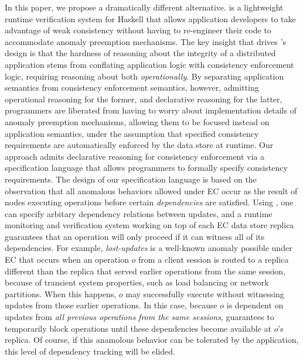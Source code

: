 In this paper, we propose a dramatically different alternative.  \tool
is a lightweight runtime verification system for Haskell that allows
application developers to take advantage of weak consistency without
having to re-engineer their code to accommodate anomaly preemption
mechanisms.  The key insight that drives \tool's design is that the
hardness of reasoning about the integrity of a distributed application
stems from conflating application logic with consistency enforcement
logic, requiring reasoning about both \emph{operationally}.  By
separating application semantics from consistency enforcement
semantics, however, admitting operational reasoning for the former,
and declarative reasoning for the latter, programmers are liberated
from having to worry about implementation details of anomaly
preemption mechanisms, allowing them to be focused instead on
application semantics, under the assumption that specified consistency
requirements are automatically enforced by the data store at runtime.
%
Our approach admits declarative reasoning for consistency enforcement
via a specification language that allows programmers to formally
specify consistency requirements.  The design of our specification
language is based on the observation that all anomalous behaviors
allowed under EC occur as the result of nodes executing operations
before certain \emph{dependencies} are satisfied.  Using \tool, one
can specify arbitary dependency relations between updates, and a
runtime monitoring and verification system working on top of each EC
data store replica guarantees that an operation will only proceed if
it can witness all of its dependencies.  For example,
\emph{lost-updates} is a well-known anomaly possible under EC that
occurs when an operation $o$ from a client session is routed to a
replica different than the replica that served earlier operations from
the same session, because of transient system properties, such as load
balancing or network partitions.  When this happens, $o$ may
successfully execute without witnessing updates from those earlier
operations. In this case, because $o$ is dependent on updates from
\emph{all previous operations from the same sessions}, \tool
guarantees to temporarily block operations until these dependencies
become available at $o$'s replica.  Of course, if this anamolous
behavior can be tolerated by the application, this level of dependency
tracking will be elided.

%
%


